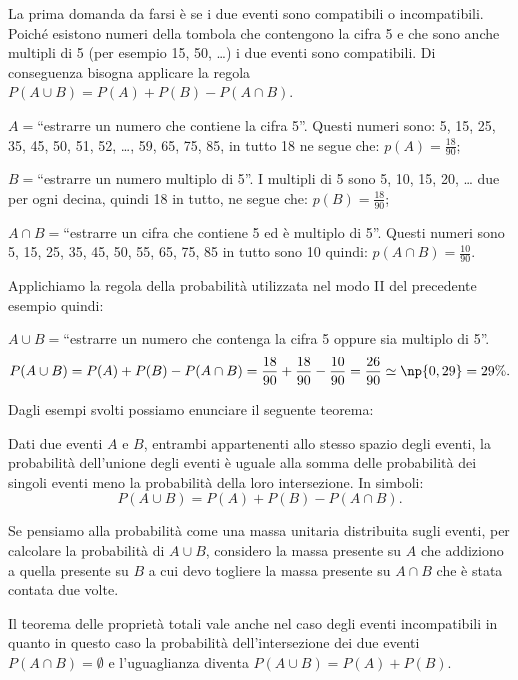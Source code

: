 \begin{exrig}
\begin{esempio}
La prima domanda da farsi è se i due eventi sono compatibili o incompatibili. Poiché esistono numeri della tombola che contengono la cifra 5 e che sono anche multipli di 5 (per esempio 15, 50, \ldots) i due eventi sono compatibili. Di conseguenza bisogna applicare la regola $P(A\cup B)=P(A)+P(B)-P(A\cap B)$.
\begin{itemize*}
\item $A=$``estrarre un numero che contiene la cifra 5''. Questi numeri sono: 5, 15, 25, 35, 45, 50, 51, 52, \ldots, 59, 65, 75, 85, in tutto 18 ne segue che: $p(A)=\frac{18}{90}$;
\item $B=$``estrarre un numero multiplo di 5''. I multipli di 5 sono 5, 10, 15, 20, \ldots{} due per ogni decina, quindi 18 in tutto, ne segue che: $p(B)=\frac{18}{90}$;
\item $A\cap B=$``estrarre un cifra che contiene 5 ed è multiplo di 5''. Questi numeri sono 5, 15, 25, 35, 45, 50, 55, 65, 75, 85 in tutto sono 10 quindi: $p(A\cap B)=\frac{10}{90}$.
\end{itemize*}
Applichiamo la regola della probabilità utilizzata nel modo II del precedente esempio quindi:

$A\cup B=$``estrarre un numero che contenga la cifra 5 oppure sia multiplo di 5''. \[P(A\cup B)=P(A)+P(B)-P(A\cap B)=\frac{18}{90}+\frac{18}{90}-\frac{10}{90}=\frac{26}{90}\simeq \np{0,29}= 29\%. \]
\end{esempio}
\end{exrig}

Dagli esempi svolti possiamo enunciare il seguente teorema:

\begin{teorema}
Dati due eventi $A$ e $B$, entrambi appartenenti allo stesso spazio degli eventi, la probabilità dell'unione degli eventi è uguale alla somma delle probabilità dei singoli eventi meno la probabilità della loro intersezione.
In simboli: \[P(A\cup B)=P(A)+P(B)-P(A\cap B).\]
\end{teorema}

Se pensiamo alla probabilità come una massa unitaria distribuita sugli eventi, per calcolare la probabilità di $A\cup B$, considero la massa presente su $A$ che addiziono a quella presente su $B$ a cui devo togliere la massa presente su $A\cap B$ che è stata contata due volte.

\osservazione Il teorema delle proprietà totali vale anche nel caso degli eventi incompatibili in quanto in questo caso la probabilità dell'intersezione dei due eventi $P(A\cap B)=\emptyset$ e l'uguaglianza diventa $P(A\cup B)=P(A)+P(B)$.

